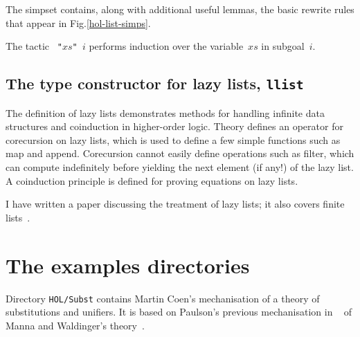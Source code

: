 The simpset  contains, along with additional useful lemmas,
the basic rewrite rules that appear in Fig.\ts\ref{hol-list-simps}.

The tactic {\tt{} "$xs$" $i$} performs induction over the
variable~$xs$ in subgoal~$i$.


\subsection{The type constructor for lazy lists, {\tt llist}}

The definition of lazy lists demonstrates methods for handling infinite
data structures and coinduction in higher-order logic.  Theory
 defines an operator for corecursion on lazy lists, which is
used to define a few simple functions such as map and append.  Corecursion
cannot easily define operations such as filter, which can compute
indefinitely before yielding the next element (if any!) of the lazy list.
A coinduction principle is defined for proving equations on lazy lists.

I have written a paper discussing the treatment of lazy lists; it also
covers finite lists~\cite{paulson-coind}.


\section{The examples directories}
Directory {\tt HOL/Subst} contains Martin Coen's mechanisation of a theory of
substitutions and unifiers.  It is based on Paulson's previous
mechanisation in {\LCF}~\cite{paulson85} of Manna and Waldinger's
theory~\cite{mw81}. 

